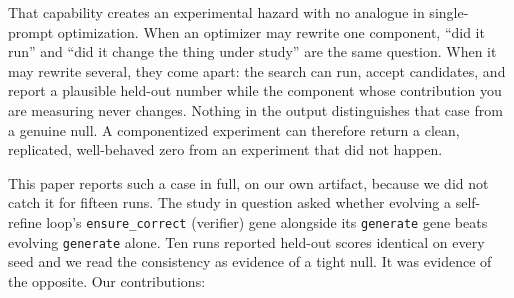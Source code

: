 \documentclass[11pt]{article}
\begin{document}
That capability creates an experimental hazard with no analogue in single-prompt optimization.
When an optimizer may rewrite one component, ``did it run'' and ``did it change the thing under
study'' are the same question. When it may rewrite several, they come apart: the search can run,
accept candidates, and report a plausible held-out number while the component whose contribution
you are measuring never changes. Nothing in the output distinguishes that case from a genuine
null. A componentized experiment can therefore return a clean, replicated, well-behaved zero from
an experiment that did not happen.

This paper reports such a case in full, on our own artifact, because we did not catch it for
fifteen runs. The study in question asked whether evolving a self-refine loop's
\texttt{ensure\_correct} (verifier) gene alongside its \texttt{generate} gene beats evolving
\texttt{generate} alone. Ten runs reported held-out scores identical on every seed and we read the
consistency as evidence of a tight null. It was evidence of the opposite. Our contributions:
\end{document}
